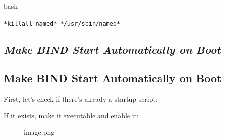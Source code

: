 bash

\texttt{*killall\ named*\ */usr/sbin/named*}

\subsection{\texorpdfstring{\textbf{\emph{Make BIND Start Automatically
on
Boot}}}{Make BIND Start Automatically on Boot}}\label{make-bind-start-automatically-on-boot}

\subsection{Make BIND Start Automatically on
Boot}\label{make-bind-start-automatically-on-boot-1}

First, let's check if there's already a startup script:

\begin{Shaded}
\begin{Highlighting}[]
 \PreprocessorTok{*}
\end{Highlighting}
\end{Shaded}

If it exists, make it executable and enable it:

\begin{Shaded}
\begin{Highlighting}[]
\end{Highlighting}
\end{Shaded}

\begin{figure}
\centering
{}
\caption{image.png}
\end{figure}

